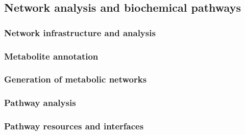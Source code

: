 \documentclass[]{article}
\begin{document}
\newpage

\hypertarget{network-analysis-and-biochemical-pathways}{%
\subsection{Network analysis and biochemical pathways}\label{network-analysis-and-biochemical-pathways}}

\hypertarget{network-infrastructure-and-analysis}{%
\subsubsection{Network infrastructure and analysis}\label{network-infrastructure-and-analysis}}

\hypertarget{metabolite-annotation}{%
\subsubsection{Metabolite annotation}\label{metabolite-annotation}}

\hypertarget{generation-of-metabolic-networks}{%
\subsubsection{Generation of metabolic networks}\label{generation-of-metabolic-networks}}

\hypertarget{pathway-analysis}{%
\subsubsection{Pathway analysis}\label{pathway-analysis}}

\hypertarget{pathway-resources-and-interfaces}{%
\subsubsection{Pathway resources and interfaces}\label{pathway-resources-and-interfaces}}
\end{document}
